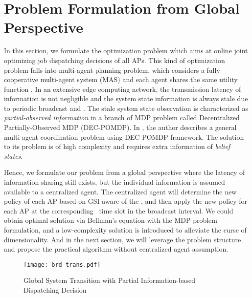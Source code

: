 \section{Problem Formulation from Global Perspective}
In this section, we formulate the optimization problem which aims at online joint optimizing job dispatching decisions of all APs.
This kind of optimization problem falls into multi-agent planning problem, which considers a fully cooperative multi-agent system (MAS) and each agent shares the same utility function .
In an extensive edge computing network, the transmission latency of information is not negligible and the system state information is always stale due to periodic broadcast and \brlatency.
The stale system state observation is characterized as \emph{partial-observed information} in a branch of MDP problem called Decentralized Partially-Observed MDP (DEC-POMDP).
In , the author describes a general multi-agent coordination problem using DEC-POMDP framework. The solution to its problem is of high complexity and requires extra information of \emph{belief states}.

Hence, we formulate our problem from a global perspective where the latency of information sharing still exists, but the individual information is assumed available to a centralized agent.
The centralized agent will determine the new policy of each AP based on GSI aware of the \brlatency, and then apply the new policy for each AP at the corresponding \brlatency~time slot in the broadcast interval.
We could obtain optimal solution via Bellman's equation with the MDP problem formulation, and  a low-complexity solution is introduced to alleviate the curse of dimensionality.
And in the next section, we will leverage the problem structure and propose the practical algorithm without centralized agent assumption.


\begin{figure}[htp]
    \centering
    \texttt{[image: brd-trans.pdf]}
    \caption{Global System Transition with Partial Information-based Dispatching Decision}
    \label{fig:brd-trans}
\end{figure}

